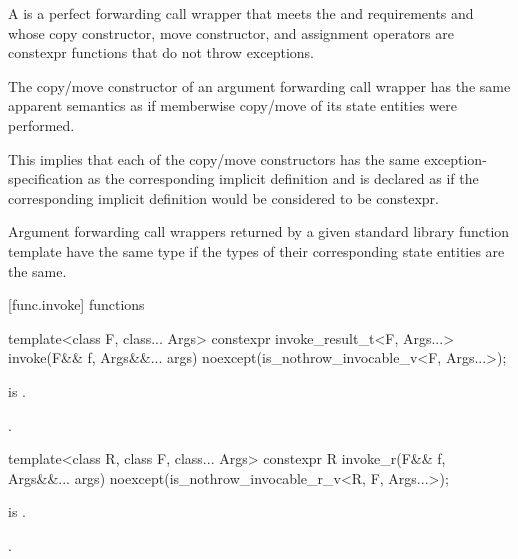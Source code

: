 \pnum
\label{term.simple.call.wrapper}%
A  is a perfect forwarding call wrapper that meets
the  and  requirements
and whose copy constructor, move constructor, and assignment operators
are constexpr functions that do not throw exceptions.

\pnum
The copy/move constructor of an argument forwarding call wrapper has
the same apparent semantics
as if memberwise copy/move of its state entities
were performed.
\begin{note}
This implies that each of the copy/move constructors has
the same exception-specification as
the corresponding implicit definition and is declared as 
if the corresponding implicit definition would be considered to be constexpr.
\end{note}

\pnum
Argument forwarding call wrappers returned by
a given standard library function template have the same type
if the types of their corresponding state entities are the same.

[func.invoke]{ functions}
%
%
\begin{itemdecl}
template<class F, class... Args>
  constexpr invoke_result_t<F, Args...> invoke(F&& f, Args&&... args)
    noexcept(is_nothrow_invocable_v<F, Args...>);
\end{itemdecl}

\begin{itemdescr}
\pnum
\constraints
{} is .

\pnum
\returns
{}.
\end{itemdescr}

%
\begin{itemdecl}
template<class R, class F, class... Args>
  constexpr R invoke_r(F&& f, Args&&... args)
    noexcept(is_nothrow_invocable_r_v<R, F, Args...>);
\end{itemdecl}

\begin{itemdescr}
\pnum
\constraints
{} is .

\pnum
\returns
{}.
\end{itemdescr}

